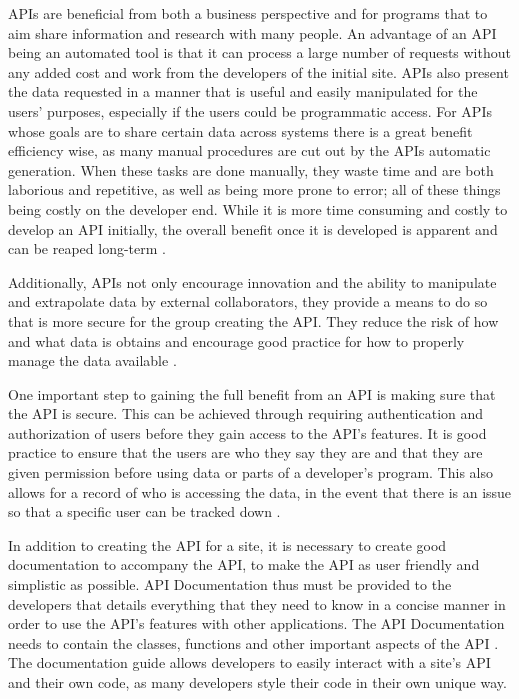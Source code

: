		APIs are beneficial from both a business perspective and for programs that to aim share 
		information and research with many people. An advantage of an API being an automated 
		tool is that it can process a large number of requests without any added cost and work 
		from the developers of the initial site. APIs also present the data requested in a manner that is useful 
		and easily manipulated for the users' purposes, especially if the users could be programmatic access. 
		For APIs whose goals are to share 
		certain data across systems there is a great benefit efficiency wise, as many manual 
		procedures are cut out by the APIs automatic generation. When these tasks are done 
		manually, they waste time and are both laborious and repetitive, as well as being more 
		prone to error; all of these things being costly on the developer end. While it is more 
		time consuming and costly to develop an API initially, the overall benefit once it is 
		developed is apparent and can be reaped long-term \cite{govapi}.

		Additionally, APIs not only encourage innovation and the ability to manipulate and 
		extrapolate data by external collaborators, they provide a means to do so that is 
		more secure for the group creating the API. They reduce the risk of how and what data 
		is obtains and encourage good practice for how to properly manage the data 
		available \cite{readwrite}.

	One important step to gaining the full benefit from an API is making sure that the API is 
	secure. This can be achieved through requiring authentication and authorization of users 
	before they gain access to the API's features. It is good practice to ensure that the users 
	are who they say they are and that they are given permission before using data or parts of 
	a developer's program. This also allows for a record of who is accessing the data, 
	in the event that there is an issue so that a specific user can be tracked down \cite{jisc}.

	In addition to creating the API for a site, it is necessary to create good documentation to 
	accompany the API, to make the API as user friendly and simplistic as possible. 
	API Documentation thus must be provided to the developers that details everything that they need to know in a concise 
	manner in order to use the API’s features with other applications. The API Documentation 
	needs to contain the classes, functions and other important aspects of the API \cite{cio}. 
	The documentation guide allows developers to easily interact with a site's API and their 
	own code, as many developers style their code in their own unique way. 

